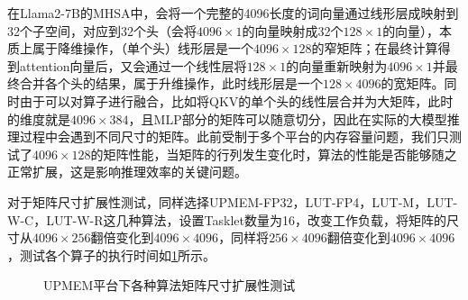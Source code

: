 在Llama2-7B的MHSA中，会将一个完整的4096长度的词向量通过线形层成映射到32个子空间，对应到32个头（会将$4096\times 1$的向量映射成32个$128\times 1$的向量），本质上属于降维操作，（单个头）线形层是一个$4096\times 128$的窄矩阵；在最终计算得到attention向量后，又会通过一个线性层将$128\times 1$的向量重新映射为$4096\times 1$并最终合并各个头的结果，属于升维操作，此时线形层是一个$128\times 4096$的宽矩阵。同时由于可以对算子进行融合，比如将QKV的单个头的线性层合并为大矩阵，此时的维度就是$4096\times 384$，且MLP部分的矩阵可以随意切分，因此在实际的大模型推理过程中会遇到不同尺寸的矩阵。此前受制于多个平台的内存容量问题，我们只测试了$4096\times 128$的矩阵性能，当矩阵的行列发生变化时，算法的性能是否能够随之正常扩展，这是影响推理效率的关键问题。

对于矩阵尺寸扩展性测试，同样选择UPMEM-FP32，LUT-FP4，LUT-M，LUT-W-C，LUT-W-R这几种算法，设置Tasklet数量为16，改变工作负载，将矩阵的尺寸从$4096\times 256$翻倍变化到$4096\times 4096$，同样将$256\times 4096$翻倍变化到$4096\times 4096$，测试各个算子的执行时间如\ref{EXP3-2}所示。

\begin{figure}[htbp!]
	\centering
	\label{EXP3-2}
	\caption{UPMEM平台下各种算法矩阵尺寸扩展性测试}
\end{figure}


